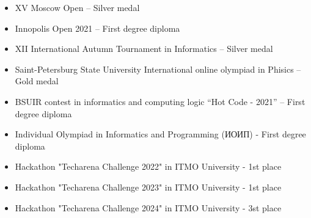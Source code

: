 \documentclass[10pt]{article}
\begin{document}
\begin{itemize}[itemsep = -0.75 mm, leftmargin=*]
\item[{\color[RGB]{10,0,254}$\bullet$}] \noindent XV  Moscow Open – Silver medal

\item[{\color[RGB]{10,0,254}$\bullet$}] \noindent Innopolis Open 2021 – First degree diploma

\item[{\color[RGB]{10,0,254}$\bullet$}] \noindent XII International Autumn Tournament in Informatics – Silver medal  

\item[{\color[RGB]{10,0,254}$\bullet$}] \noindent Saint-Petersburg State University International online olympiad in Phisics – Gold medal  

\item[{\color[RGB]{10,0,254}$\bullet$}] \noindent BSUIR contest in informatics and computing logic “Hot Code - 2021” – First degree diploma

\item[{\color[RGB]{10,0,254}$\bullet$}] \noindent Individual Olympiad in Informatics and Programming (\foreignlanguage{russian}{ИОИП}) -  First degree diploma

\item[{\color[RGB]{10,0,254}$\bullet$}] \noindent Hackathon "Techarena Challenge 2022" in ITMO University - 1st place

\item[{\color[RGB]{10,0,254}$\bullet$}] \noindent Hackathon "Techarena Challenge 2023" in ITMO University - 1st place

\item[{\color[RGB]{10,0,254}$\bullet$}] \noindent Hackathon "Techarena Challenge 2024" in ITMO University - 3st place

\end{itemize}
\end{document}
